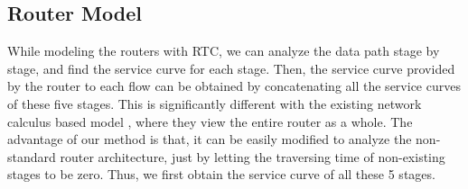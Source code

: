 \documentclass[10pt,journal]{IEEEtran}
\begin{document}
\subsection{Router Model}\label{router}
While modeling the routers with RTC, we can analyze the data path stage by stage, and find the service curve for each stage. Then, the service curve provided by the router to each flow can be obtained by concatenating all the service curves of these five stages. This is significantly different with the existing network calculus based model \cite{Qian2010Analysis,Qian489900}, where they view the entire router as a whole. The advantage of our method is that, it can be easily modified to analyze the non-standard router architecture, just by letting the traversing time of non-existing stages to be zero. Thus, we first obtain the service curve of all these 5 stages.
\end{document}
